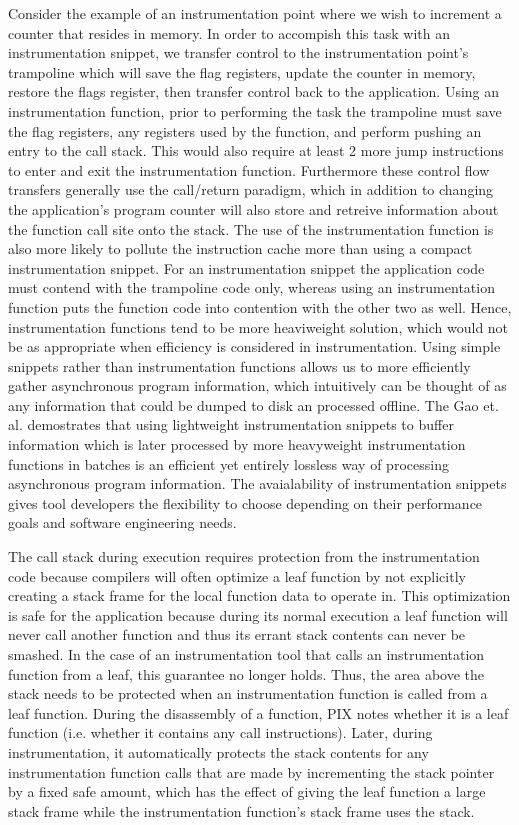 Consider the example of an instrumentation point where we wish to increment a counter that resides in memory. 
In order to accompish this task with an instrumentation snippet, we transfer control to the
instrumentation point's trampoline which will save the flag registers, update the counter in memory, restore
the flags register, then transfer control back to the application. Using an instrumentation function, prior to performing
the task the trampoline must save the flag registers, any registers used by the function, and perform pushing an entry to the call stack.
This would also require at least 2 more jump instructions to enter and exit the instrumentation function. 
Furthermore these control flow transfers generally use the call/return paradigm, which in addition to changing the
application's program counter will also store and retreive information about the function call site onto the stack. 
The use of the instrumentation function is also more likely to pollute the instruction cache more than using a compact
instrumentation snippet. For an instrumentation snippet the application code must contend with the trampoline code
only, whereas using an instrumentation function puts the function code into contention with the other two as well. Hence, 
instrumentation functions tend to be more heaviweight solution, which would not be as appropriate when efficiency is considered
in instrumentation. Using simple snippets rather than instrumentation functions allows us to more efficiently gather 
asynchronous program information, which intuitively can be thought of as any information that could be dumped to
disk an processed offline. The Gao et. al. \cite{gao2005aliter} demostrates that using lightweight instrumentation snippets to buffer information
which is later processed by more heavyweight instrumentation functions in batches is an efficient yet entirely lossless way of processing asynchronous
program information. The avaialability of instrumentation snippets gives tool developers the flexibility to choose 
depending on their performance goals and software engineering needs.

The call stack during execution requires protection from the instrumentation code because compilers will often optimize a leaf function
by not explicitly creating a stack frame for the local function data to operate in. This optimization is safe for the application because during its
normal execution a leaf function will never call another function and thus its errant stack contents can never be smashed. In the case of an instrumentation
tool that calls an instrumentation function from a leaf, this guarantee no longer holds. Thus, the area above the stack needs to be protected when
an instrumentation function is called from a leaf function. During the disassembly of a function, PIX notes whether it is a leaf function (i.e. whether it contains any call
instructions). Later, during instrumentation, it automatically protects the stack contents for any instrumentation function calls that are made by
incrementing the stack pointer by a fixed safe amount, which has the effect of giving the leaf function a large stack frame while the instrumentation
function's stack frame uses the stack.

